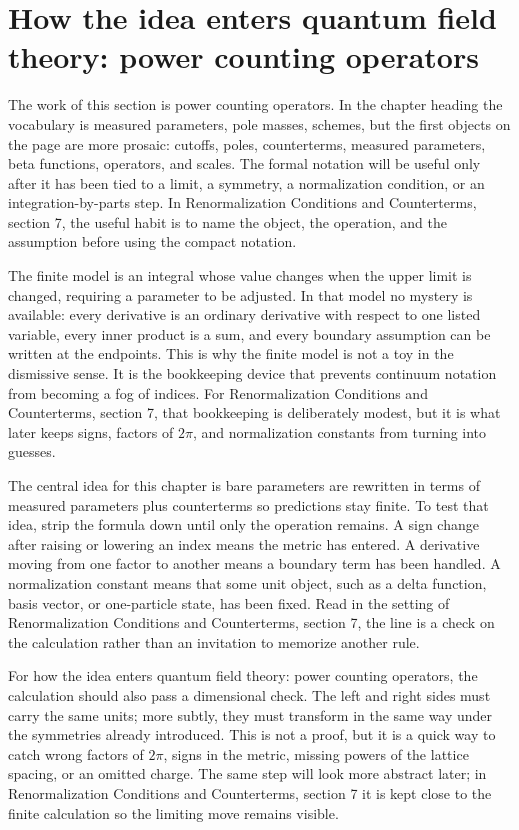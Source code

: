 \section{How the idea enters quantum field theory: power counting operators}

The work of this section is power counting operators.  In the chapter heading the vocabulary is measured parameters, pole masses, schemes, but the first objects on the page are more prosaic: cutoffs, poles, counterterms, measured parameters, beta functions, operators, and scales.  The formal notation will be useful only after it has been tied to a limit, a symmetry, a normalization condition, or an integration-by-parts step.  In Renormalization Conditions and Counterterms, section 7, the useful habit is to name the object, the operation, and the assumption before using the compact notation.

The finite model is an integral whose value changes when the upper limit is changed, requiring a parameter to be adjusted.  In that model no mystery is available: every derivative is an ordinary derivative with respect to one listed variable, every inner product is a sum, and every boundary assumption can be written at the endpoints.  This is why the finite model is not a toy in the dismissive sense.  It is the bookkeeping device that prevents continuum notation from becoming a fog of indices.  For Renormalization Conditions and Counterterms, section 7, that bookkeeping is deliberately modest, but it is what later keeps signs, factors of \(2\pi\), and normalization constants from turning into guesses.

The central idea for this chapter is bare parameters are rewritten in terms of measured parameters plus counterterms so predictions stay finite.  To test that idea, strip the formula down until only the operation remains.  A sign change after raising or lowering an index means the metric has entered.  A derivative moving from one factor to another means a boundary term has been handled.  A normalization constant means that some unit object, such as a delta function, basis vector, or one-particle state, has been fixed.  Read in the setting of Renormalization Conditions and Counterterms, section 7, the line is a check on the calculation rather than an invitation to memorize another rule.

For how the idea enters quantum field theory: power counting operators, the calculation should also pass a dimensional check.  The left and right sides must carry the same units; more subtly, they must transform in the same way under the symmetries already introduced.  This is not a proof, but it is a quick way to catch wrong factors of \(2\pi\), signs in the metric, missing powers of the lattice spacing, or an omitted charge.  The same step will look more abstract later; in Renormalization Conditions and Counterterms, section 7 it is kept close to the finite calculation so the limiting move remains visible.

